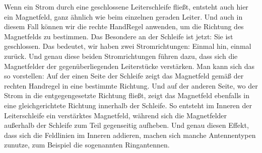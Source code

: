 \begin{frame}
{	Wenn ein Strom durch eine geschlossene Leiterschleife fließt, entsteht auch hier ein Magnetfeld, ganz ähnlich wie beim einzelnen geraden Leiter.
	Und auch in diesem Fall können wir die rechte HandRegel anwenden, um die Richtung des Magnetfelds zu bestimmen.
	Das Besondere an der Schleife ist jetzt: Sie ist geschlossen.
	Das bedeutet, wir haben zwei Stromrichtungen: Einmal hin, einmal zurück.
	Und genau diese beiden Stromrichtungen führen dazu, dass sich die Magnetfelder der gegenüberliegenden Leiterstücke verstärken.
	Man kann sich das so vorstellen: Auf der einen Seite der Schleife zeigt das Magnetfeld gemäß der rechten Handregel in eine bestimmte Richtung.
	Und auf der anderen Seite, wo der Strom in die entgegengesetzte Richtung fließt, zeigt das Magnetfeld ebenfalls in eine gleichgerichtete Richtung innerhalb der Schleife.
	So entsteht im Inneren der Leiterschleife ein verstärktes Magnetfeld, während sich die Magnetfelder außerhalb der Schleife zum Teil gegenseitig aufheben.
	Und genau diesen Effekt, dass sich die Feldlinien im Inneren addieren, machen sich manche Antennentypen zunutze, zum Beispiel die sogenannten Ringantennen.
}
\end{frame}

